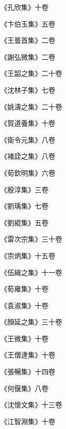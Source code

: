 \begin{pinyinscope}
 《孔欣集》十卷



 《卞伯玉集》五卷



 《王曇首集》二卷



 《謝弘微集》二卷



 《王韶之集》二十卷



 《沈林子集》七卷



 《姚濤之集》二十卷



 《賀道養集》十卷



 《衛令元集》八卷



 《褚詮之集》八卷



 《荀欽明集》六卷



 《殷淳集》三卷



 《劉瑀集》七卷



 《劉緄集》五卷



 《雷次宗集》三十卷



 《宗炳集》十五卷



 《伍緝之集》十一卷



 《荀雍集》十卷



 《袁淑集》十卷



 《顏延之集》三十卷



 《王微集》十卷



 《王僧達集》十卷



 《張暢集》十四卷



 《何偃集》八卷



 《沈懷文集》十三卷



 《江智淵集》十卷




\end{pinyinscope}
